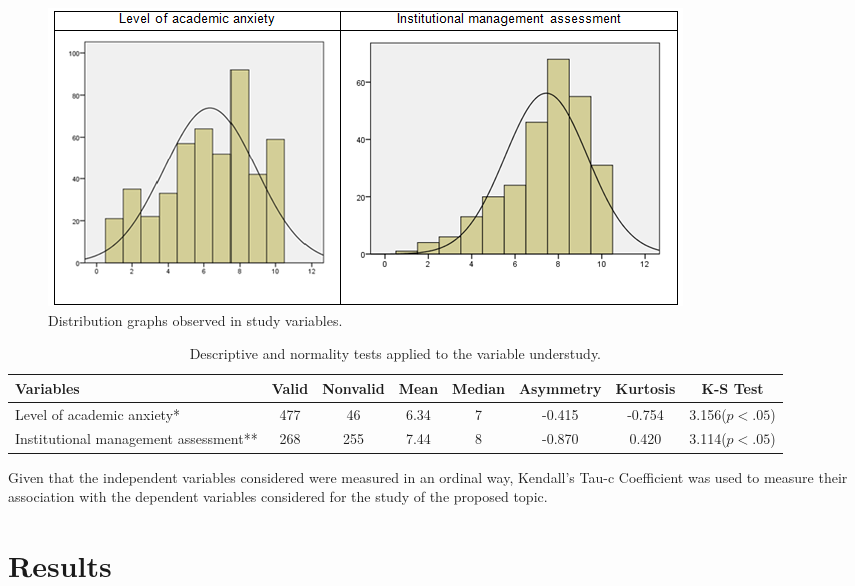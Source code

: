 \documentclass[english]{textolivre}
\begin{document}
\begin{figure}[htbp]
\centering
\begin{minipage}{.8\textwidth}
\caption{Distribution graphs observed in study variables.}
\label{Figure01}
\includegraphics[width=\textwidth]{fig1.png}
\end{minipage}
\end{figure}

\begin{table}[h!]
\centering
\begin{threeparttable}
\caption{Descriptive and normality tests applied to the variable understudy.}
\label{Table05}
\begin{tabular}{p{}*{7}{c}}
\toprule
Variables & Valid & Nonvalid & Mean & Median & Asymmetry & Kurtosis & K-S Test \\
\midrule
Level of academic anxiety* & 477 & 46 & 6.34 & 7 & -0.415 & -0.754 & 3.156($p<.05$) \\
Institutional management assessment** & 268 & 255 & 7.44 & 8 & -0.870 & 0.420 & 3.114($p<.05$) \\
\bottomrule
\end{tabular}
\end{threeparttable}
\end{table}
 
Given that the independent variables considered were measured in an ordinal way, Kendall's Tau-c Coefficient was used to measure their association with the dependent variables considered for the study of the proposed topic.

\section{Results}
\end{document}
